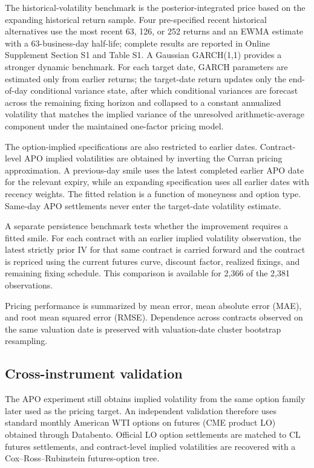 The historical-volatility benchmark is the posterior-integrated price based on the expanding historical return sample. Four pre-specified recent historical alternatives use the most recent 63, 126, or 252 returns and an EWMA estimate with a 63-business-day half-life; complete results are reported in Online Supplement Section S1 and Table S1. A Gaussian GARCH(1,1) provides a stronger dynamic benchmark. For each target date, GARCH parameters are estimated only from earlier returns; the target-date return updates only the end-of-day conditional variance state, after which conditional variances are forecast across the remaining fixing horizon and collapsed to a constant annualized volatility that matches the implied variance of the unresolved arithmetic-average component under the maintained one-factor pricing model.

The option-implied specifications are also restricted to earlier dates. Contract-level APO implied volatilities are obtained by inverting the Curran pricing approximation. A previous-day smile uses the latest completed earlier APO date for the relevant expiry, while an expanding specification uses all earlier dates with recency weights. The fitted relation is a function of moneyness and option type. Same-day APO settlements never enter the target-date volatility estimate.

A separate persistence benchmark tests whether the improvement requires a fitted smile. For each contract with an earlier implied volatility observation, the latest strictly prior IV for that same contract is carried forward and the contract is repriced using the current futures curve, discount factor, realized fixings, and remaining fixing schedule. This comparison is available for 2,366 of the 2,381 observations.

Pricing performance is summarized by mean error, mean absolute error (MAE), and root mean squared error (RMSE). Dependence across contracts observed on the same valuation date is preserved with valuation-date cluster bootstrap resampling.

\subsection{Cross-instrument validation}

The APO experiment still obtains implied volatility from the same option family later used as the pricing target. An independent validation therefore uses standard monthly American WTI options on futures (CME product LO) obtained through Databento. Official LO option settlements are matched to CL futures settlements, and contract-level implied volatilities are recovered with a Cox--Ross--Rubinstein futures-option tree.

